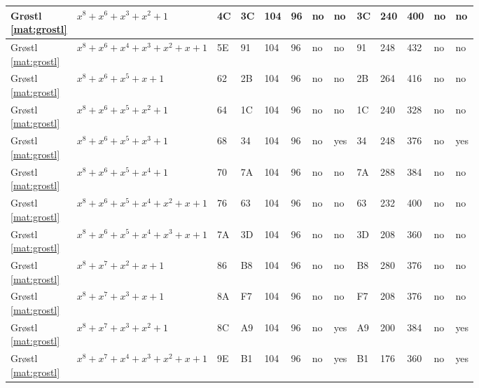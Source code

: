 \begin{tiny}
\begin{longtable}{|l|l|l|l|l|l|l|l|l|l|l|l|l|}
\shortstack{Gr{\o}stl \\ \eqref{mat:grostl}} & $x^8 + x^6 + x^3 + x^2 + 1$ & 4C & 3C & 104 & 96 & no & no & 3C & 240 & 400 & no & no \\ \hline
\shortstack{Gr{\o}stl \\ \eqref{mat:grostl}} & $x^8 + x^6 + x^4 + x^3 + x^2 + x + 1$ & 5E & 91 & 104 & 96 & no & no & 91 & 248 & 432 & no & no \\ \hline
\shortstack{Gr{\o}stl \\ \eqref{mat:grostl}} & $x^8 + x^6 + x^5 + x + 1$ & 62 & 2B & 104 & 96 & no & no & 2B & 264 & 416 & no & no \\ \hline
\shortstack{Gr{\o}stl \\ \eqref{mat:grostl}} & $x^8 + x^6 + x^5 + x^2 + 1$ & 64 & 1C & 104 & 96 & no & no & 1C & 240 & 328 & no & no \\ \hline
\shortstack{Gr{\o}stl \\ \eqref{mat:grostl}} & $x^8 + x^6 + x^5 + x^3 + 1$ & 68 & 34 & 104 & 96 & no & yes & 34 & 248 & 376 & no & yes \\ \hline
\shortstack{Gr{\o}stl \\ \eqref{mat:grostl}} & $x^8 + x^6 + x^5 + x^4 + 1$ & 70 & 7A & 104 & 96 & no & no & 7A & 288 & 384 & no & no \\ \hline
\shortstack{Gr{\o}stl \\ \eqref{mat:grostl}} & $x^8 + x^6 + x^5 + x^4 + x^2 + x + 1$ & 76 & 63 & 104 & 96 & no & no & 63 & 232 & 400 & no & no \\ \hline
\shortstack{Gr{\o}stl \\ \eqref{mat:grostl}} & $x^8 + x^6 + x^5 + x^4 + x^3 + x + 1$ & 7A & 3D & 104 & 96 & no & no & 3D & 208 & 360 & no & no \\ \hline
\shortstack{Gr{\o}stl \\ \eqref{mat:grostl}} & $x^8 + x^7 + x^2 + x + 1$ & 86 & B8 & 104 & 96 & no & no & B8 & 280 & 376 & no & no \\ \hline
\shortstack{Gr{\o}stl \\ \eqref{mat:grostl}} & $x^8 + x^7 + x^3 + x + 1$ & 8A & F7 & 104 & 96 & no & no & F7 & 208 & 376 & no & no \\ \hline
\shortstack{Gr{\o}stl \\ \eqref{mat:grostl}} & $x^8 + x^7 + x^3 + x^2 + 1$ & 8C & A9 & 104 & 96 & no & yes & A9 & 200 & 384 & no & yes \\ \hline
\shortstack{Gr{\o}stl \\ \eqref{mat:grostl}} & $x^8 + x^7 + x^4 + x^3 + x^2 + x + 1$ & 9E & B1 & 104 & 96 & no & yes & B1 & 176 & 360 & no & yes \\ \hline

\end{longtable}
\end{tiny}
